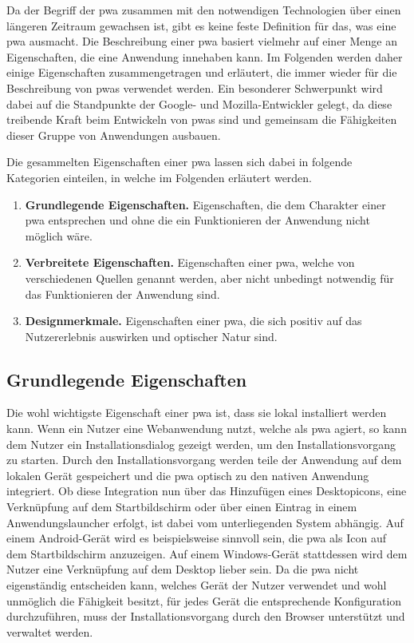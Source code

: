 \documentclass[12pt, parskip=half]{scrartcl}       %
\newcommand\litem[1]{\item{\bfseries#1.\space}}
\begin{document}
Da der Begriff der \ac{pwa} zusammen mit den notwendigen Technologien über einen längeren Zeitraum gewachsen ist, gibt es keine feste Definition für das, was eine \ac{pwa} ausmacht.
Die Beschreibung einer \ac{pwa} basiert vielmehr auf einer Menge an Eigenschaften, die eine Anwendung innehaben kann.
Im Folgenden werden daher einige Eigenschaften zusammengetragen und erläutert, die immer wieder für die Beschreibung von \acp{pwa} verwendet werden.
Ein besonderer Schwerpunkt wird dabei auf die Standpunkte der Google- und Mozilla-Entwickler gelegt, da diese treibende Kraft beim Entwickeln von \acp{pwa} sind und gemeinsam die Fähigkeiten dieser Gruppe von Anwendungen ausbauen.

Die gesammelten Eigenschaften einer \ac{pwa} lassen sich dabei in folgende Kategorien einteilen, in welche im Folgenden erläutert werden.

\begin{enumerate}
  \litem{Grundlegende Eigenschaften} Eigenschaften, die dem Charakter einer \ac{pwa} entsprechen und ohne die ein Funktionieren der Anwendung nicht möglich wäre.

  \litem{Verbreitete Eigenschaften} Eigenschaften einer \ac{pwa}, welche von verschiedenen Quellen genannt werden, aber nicht unbedingt notwendig für das Funktionieren der Anwendung sind.

  \litem{Designmerkmale} Eigenschaften einer \ac{pwa}, die sich positiv auf das Nutzererlebnis auswirken und optischer Natur sind.
\end{enumerate}


\subsection{Grundlegende Eigenschaften}

Die wohl wichtigste Eigenschaft einer \ac{pwa} ist, dass sie lokal installiert werden kann.
Wenn ein Nutzer eine Webanwendung nutzt, welche als \ac{pwa} agiert, so kann dem Nutzer ein Installationsdialog gezeigt werden, um den Installationsvorgang zu starten.
Durch den Installationsvorgang werden teile der Anwendung auf dem lokalen Gerät gespeichert und die \ac{pwa} optisch zu den nativen Anwendung integriert.
Ob diese Integration nun über das Hinzufügen eines Desktopicons, eine Verknüpfung auf dem Startbildschirm oder über einen Eintrag in einem Anwendungslauncher erfolgt, ist dabei vom unterliegenden System abhängig.
Auf einem Android-Gerät wird es beispielsweise sinnvoll sein, die \ac{pwa} als Icon auf dem Startbildschirm anzuzeigen.
Auf einem Windows-Gerät stattdessen wird dem Nutzer eine Verknüpfung auf dem Desktop lieber sein.
Da die \ac{pwa} nicht eigenständig entscheiden kann, welches Gerät der Nutzer verwendet und wohl unmöglich die Fähigkeit besitzt, für jedes Gerät die entsprechende Konfiguration durchzuführen, muss der Installationsvorgang durch den Browser unterstützt und verwaltet werden.
\end{document}
